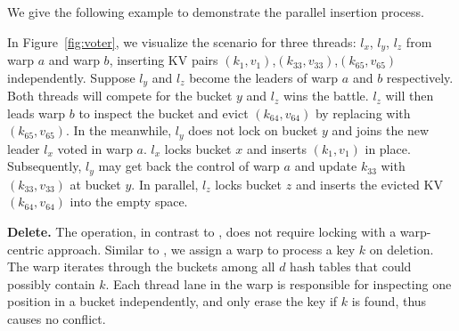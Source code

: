 We give the following example to demonstrate the parallel insertion process.
\begin{example}
	In Figure~\ref{fig:voter}, we visualize the scenario for three threads: $l_x$, $l_y$, $l_z$ from warp $a$ and warp $b$, inserting KV pairs $(k_1,v_1)$,$(k_{33},v_{33})$,$(k_{65},v_{65})$ independently. 
	Suppose $l_y$ and $l_z$ become the leaders of warp $a$ and $b$ respectively. Both threads will compete for the bucket $y$ and $l_z$ wins the battle. 
	$l_z$ will then leads warp $b$ to inspect the bucket and evict $(k_{64},v_{64})$ by replacing with $(k_{65},v_{65})$. 
	In the meanwhile, $l_y$ does not lock on bucket $y$ and joins the new leader $l_x$ voted in warp $a$. 
	$l_x$ locks bucket $x$ and inserts $(k_1,v_1)$ in place. Subsequently, $l_y$ may get back the control of warp $a$ and update $k_{33}$ with $(k_{33},v_{33})$ at bucket $y$. In parallel, $l_z$ locks bucket $z$ and inserts the evicted KV $(k_{64},v_{64})$ into the empty space. 
\end{example}

\vspace{1mm}\noindent\textbf{Delete.} The  operation, in contrast to , does not require locking with a warp-centric approach. 
Similar to , we assign a warp to process a key $k$ on deletion. The warp iterates through the buckets among all $d$ hash tables that could possibly contain $k$. Each thread lane in the warp is responsible for inspecting one position in a bucket independently, and only erase the key if $k$ is found, thus causes no conflict.



